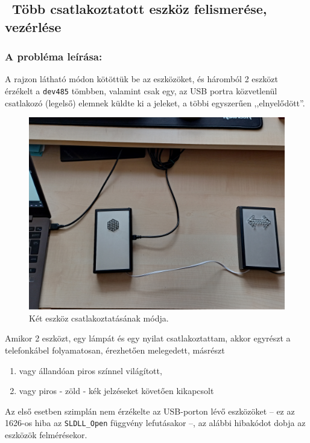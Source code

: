 \documentclass[tocnopagenum]{thesis-ekf}
\theoremstyle{definition}
\theoremstyle{remark}
\begin{document}
	\subsection{\ Több csatlakoztatott eszköz felismerése, vezérlése}
	\subsubsection{A probléma leírása:}
	A rajzon látható módon kötöttük be az eszközöket, és háromból 2 eszközt érzékelt a \verb*|dev485| tömbben, valamint csak egy, az USB portra közvetlenül csatlakozó (legelső) elemnek küldte ki a jeleket, a többi egyszerűen ,,elnyelődött''.
	\begin{figure}[h!]
		\centering
		\includegraphics[scale=0.07]{images/foto_sorbakotes.jpg}
		\caption{Két eszköz csatlakoztatásának módja.}
		\label{fig:foto_sorbakotes}
	\end{figure}	
	
	Amikor 2 eszközt, egy lámpát és egy nyilat csatlakoztattam, akkor egyrészt a telefonkábel folyamatosan, érezhetően melegedett, másrészt 
	\renewcommand{\labelenumi}{\alph{enumi})}
	\begin{enumerate}
		\item vagy állandóan piros színnel világított, 
		\item vagy piros - zöld - kék jelzéseket követően kikapcsolt
	\end{enumerate}
	Az első esetben szimplán nem érzékelte az USB-porton lévő eszközöket -- ez az 1626-os hiba az \verb*|SLDLL_Open| függvény lefutásakor --, az alábbi hibakódot dobja az eszközök felmérésekor.
\end{document}
